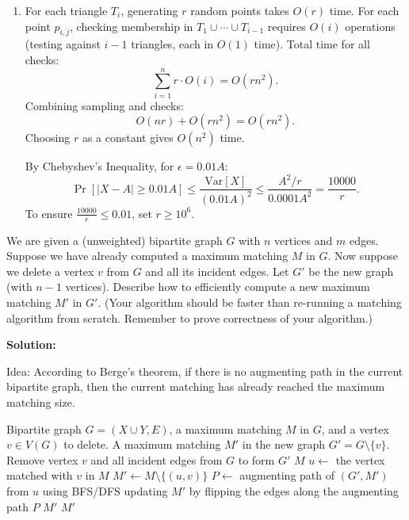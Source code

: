 \documentclass[11pt]{article}
\newcommand{\Var}{\textrm{Var}}
\begin{document}
\begin{description}
\begin{enumerate}
    \item[(c)] 
    For each triangle \( T_i \), generating \( r \) random points takes \( O(r) \) time.
    For each point \( p_{i,j} \), checking membership in \( T_1 \cup \cdots \cup T_{i-1} \) 
    requires \( O(i) \) operations (testing against \( i-1 \) triangles, each in \( O(1) \) time).  
    Total time for all checks:  
    \[
    \sum_{i=1}^n r \cdot O(i) = O(rn^2).
    \]
    Combining sampling and checks:  
    \[
    O(nr) + O(rn^2) = O(rn^2).
    \]
    Choosing \( r \) as a constant gives \( O(n^2) \) time.

    By Chebyshev's Inequality, for \( \epsilon = 0.01A \):  
    \[
    \Pr\left[|X - A| \geq 0.01A\right] \leq \frac{\Var[X]}{(0.01A)^2} \leq \frac{A^2/r}{0.0001A^2} = \frac{10000}{r}.
    \]
    To ensure \( \frac{10000}{r} \leq 0.01 \), set \( r \geq 10^6 \).
\end{enumerate}


\newpage
\item[Problem 6.3:]
We are given a (unweighted) bipartite graph $G$ with $n$ vertices and $m$ edges.  Suppose we have already computed a maximum matching $M$ in $G$.  Now suppose we delete
a vertex $v$ from $G$ and all its incident edges.  Let $G'$
be the new graph (with $n-1$ vertices).
Describe how to efficiently compute a new maximum matching $M'$
in $G'$.  (Your algorithm should be faster than re-running a matching
algorithm from scratch.  Remember to prove correctness of your algorithm.)

\textbf{Solution:}

Idea: According to Berge's theorem, 
if there is no augmenting path in the current bipartite graph, 
then the current matching has already reached the maximum matching size.
\begin{algorithm}
\caption{}
\begin{algorithmic}[1]
\Require Bipartite graph \(G = (X \cup Y, E)\), a maximum matching \(M\) in \(G\), and a vertex \(v \in V(G)\) to delete.
\Ensure A maximum matching \(M'\) in the new graph \(G' = G \setminus \{v\}\).
    \State Remove vertex \(v\) and all incident edges from \(G\) to form \(G'\)
        \State \Return \(M\) 
    \Else
        \State \(u \gets\) the vertex matched with \(v\) in \(M\)
        \State \(M' \gets M \setminus \{(u,v)\}\)
        \State \(P \gets\) augmenting path of $(G', M')$ from $u$ using BFS/DFS
            \State updating $M'$ by flipping the edges along the augmenting path $P$
            \State \Return \(M'\)
        \Else
            \State \Return \(M'\) 
        \EndIf
    \EndIf
\EndProcedure
\end{algorithmic}
\end{algorithm}


\end{description}
\end{document}
